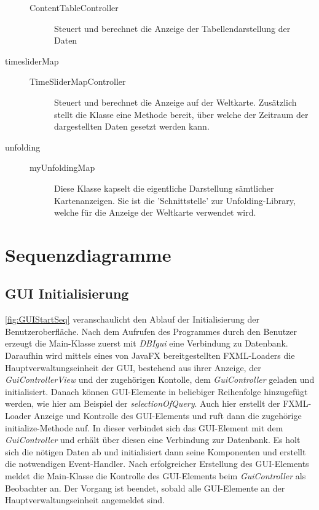 \begin{description}
\begin{description}
	    	\item [ContentTableController] Steuert und berechnet die Anzeige der Tabellendarstellung der Daten
	    \end{description}
    \item[timesliderMap] \quad
	    \begin{description}
	    	\item [TimeSliderMapController] Steuert und berechnet die Anzeige auf der Weltkarte. Zusätzlich stellt die Klasse eine Methode bereit, über welche der Zeitraum der dargestellten Daten gesetzt werden kann.
	    \end{description}
	\item[unfolding] \quad
		\begin{description}
			\item [myUnfoldingMap] Diese Klasse kapselt die eigentliche Darstellung sämtlicher Kartenanzeigen. Sie ist die 'Schnittstelle' zur Unfolding-Library, welche für die Anzeige der Weltkarte verwendet wird.
		\end{description}
	
\end{description}
\section{Sequenzdiagramme}
\subsection{GUI Initialisierung}

\cref{fig:GUIStartSeq} veranschaulicht den Ablauf der Initialisierung der Benutzeroberfläche. Nach dem Aufrufen des Programmes durch den Benutzer erzeugt die Main-Klasse zuerst mit \emph{DBIgui} eine Verbindung zu Datenbank.
Daraufhin wird mittels eines von JavaFX bereitgestellten FXML-Loaders die Hauptverwaltungseinheit der GUI, bestehend aus ihrer Anzeige, der \emph{GuiControllerView} und der zugehörigen Kontolle, dem \emph{GuiController} geladen und initialisiert.
Danach können GUI-Elemente in beliebiger Reihenfolge hinzugefügt werden, wie hier am Beispiel der \emph{selectionOfQuery}.
Auch hier erstellt der FXML-Loader Anzeige und Kontrolle des GUI-Elements und ruft dann die zugehörige initialize-Methode auf.
In dieser verbindet sich das GUI-Element mit dem \emph{GuiController} und erhält über diesen eine Verbindung zur Datenbank. Es holt sich die nötigen Daten ab und initialisiert dann seine Komponenten und erstellt die notwendigen Event-Handler.
Nach erfolgreicher Erstellung des GUI-Elements meldet die  Main-Klasse die Kontrolle des GUI-Elements beim \emph{GuiController} als Beobachter an.
Der Vorgang ist beendet, sobald alle GUI-Elemente an der Hauptverwaltungseinheit angemeldet sind.

